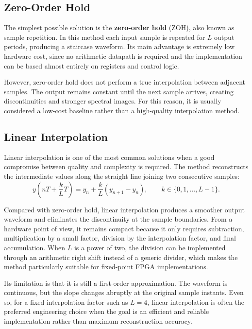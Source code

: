 \documentclass[a4paper,11pt]{article}
\begin{document}
\subsection{Zero-Order Hold}

The simplest possible solution is the \textbf{zero-order hold} (ZOH), also known as sample repetition. In this method each input sample is repeated for $L$ output periods, producing a staircase waveform. Its main advantage is extremely low hardware cost, since no arithmetic datapath is required and the implementation can be based almost entirely on registers and control logic.

However, zero-order hold does not perform a true interpolation between adjacent samples. The output remains constant until the next sample arrives, creating discontinuities and stronger spectral images. For this reason, it is usually considered a low-cost baseline rather than a high-quality interpolation method.

\subsection{Linear Interpolation}

Linear interpolation is one of the most common solutions when a good compromise between quality and complexity is required. The method reconstructs the intermediate values along the straight line joining two consecutive samples:
\[
y\left(nT + \frac{k}{L}T\right) = y_n + \frac{k}{L}(y_{n+1} - y_n), \qquad k \in \{0,1,\ldots,L-1\}.
\]

Compared with zero-order hold, linear interpolation produces a smoother output waveform and eliminates the discontinuity at the sample boundaries. From a hardware point of view, it remains compact because it only requires subtraction, multiplication by a small factor, division by the interpolation factor, and final accumulation. When $L$ is a power of two, the division can be implemented through an arithmetic right shift instead of a generic divider, which makes the method particularly suitable for fixed-point FPGA implementations.

Its limitation is that it is still a first-order approximation. The waveform is continuous, but the slope changes abruptly at the original sample instants. Even so, for a fixed interpolation factor such as $L = 4$, linear interpolation is often the preferred engineering choice when the goal is an efficient and reliable implementation rather than maximum reconstruction accuracy.
\end{document}
